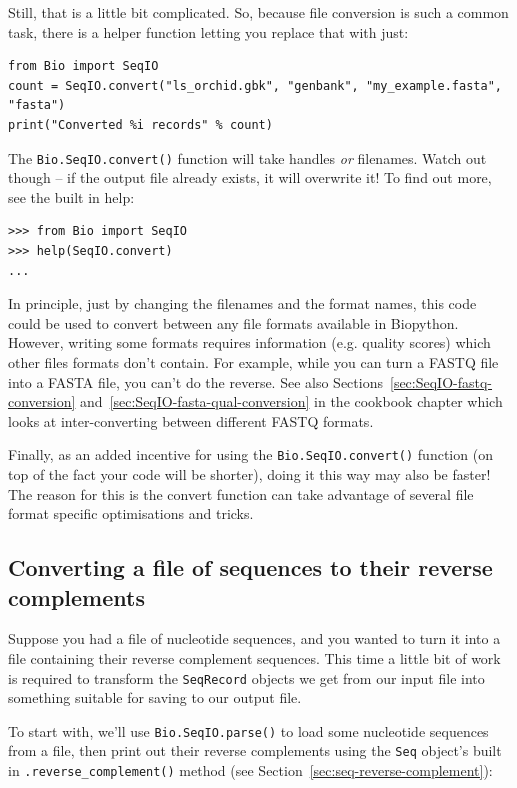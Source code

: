 \documentclass{report}
\begin{document}
Still, that is a little bit complicated. So, because file conversion is such a
common task, there is a helper function letting you replace that with just:

\begin{verbatim}
from Bio import SeqIO
count = SeqIO.convert("ls_orchid.gbk", "genbank", "my_example.fasta", "fasta")
print("Converted %i records" % count)
\end{verbatim}

The \verb|Bio.SeqIO.convert()| function will take handles \emph{or} filenames.
Watch out though -- if the output file already exists, it will overwrite it!
To find out more, see the built in help:

\begin{verbatim}
>>> from Bio import SeqIO
>>> help(SeqIO.convert)
...
\end{verbatim}

In principle, just by changing the filenames and the format names, this code
could be used to convert between any file formats available in Biopython.
However, writing some formats requires information (e.g. quality scores) which
other files formats don't contain. For example, while you can turn a FASTQ
file into a FASTA file, you can't do the reverse. See also
Sections~\ref{sec:SeqIO-fastq-conversion} and~\ref{sec:SeqIO-fasta-qual-conversion}
in the cookbook chapter which looks at inter-converting between different FASTQ formats.

Finally, as an added incentive for using the \verb|Bio.SeqIO.convert()| function
(on top of the fact your code will be shorter), doing it this way may also be
faster! The reason for this is the convert function can take advantage of
several file format specific optimisations and tricks.

\subsection{Converting a file of sequences to their reverse complements}
\label{sec:SeqIO-reverse-complement}

Suppose you had a file of nucleotide sequences, and you wanted to turn it into a file containing their reverse complement sequences.  This time a little bit of work is required to transform the \verb|SeqRecord| objects we get from our input file into something suitable for saving to our output file.

To start with, we'll use \verb|Bio.SeqIO.parse()| to load some nucleotide
sequences from a file, then print out their reverse complements using
the \verb|Seq| object's built in \verb|.reverse_complement()| method (see Section~\ref{sec:seq-reverse-complement}):
\end{document}
